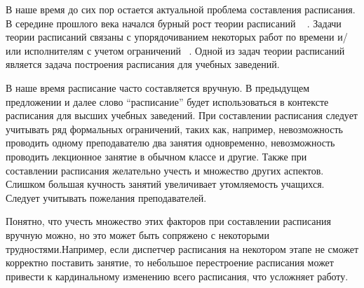 


В наше время до сих пор остается актуальной проблема составления расписания. В середине прошлого века начался бурный рост теории расписаний ~ \cite{Прорасписание}. Задачи теории расписаний связаны с упорядочиванием некоторых работ по времени и/или исполнителям с учетом ограничений ~\cite{Алгоритмы}.
Одной из задач теории расписаний является задача построения расписания для учебных заведений.

В наше время расписание часто составляется вручную. В предыдущем предложении и далее слово ``расписание'' будет использоваться в контексте расписания для высших учебных заведений. При составлении расписания следует учитывать ряд формальных ограничений, таких как, например, невозможность проводить одному преподавателю два занятия одновременно, невозможность проводить лекционное занятие в обычном классе и другие. Также при составлении расписания желательно учесть и множество других аспектов. Слишком большая кучность занятий увеличивает утомляемость учащихся. Следует учитывать пожелания преподавателей. %

 Понятно, что учесть множество этих факторов при составлении расписания вручную можно, но это может быть сопряжено с некоторыми трудностями.Например, если диспетчер расписания на некотором этапе не сможет корректно поставить занятие, то небольшое перестроение расписания может привести к кардинальному изменению всего расписания, что усложняет работу.



